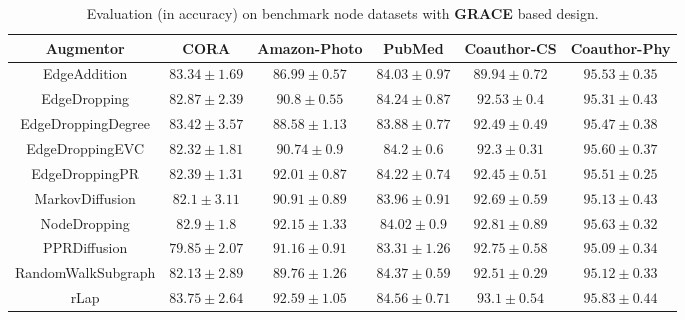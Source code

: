 \documentclass{article}
\theoremstyle{plain}
\theoremstyle{definition}
\theoremstyle{remark}
\begin{document}
\begin{table*}[ht!]
\centering
\caption{Evaluation (in accuracy) on benchmark node datasets with \textbf{GRACE} based design.}
\label{table:results_grace}
\vskip 0.15in
\begin{center}
\begin{small}
\begin{sc}
\begin{tabular}{c|c|c|c|c|c}
\toprule
Augmentor & CORA & Amazon-Photo & PubMed & Coauthor-CS & Coauthor-Phy \\
\midrule
EdgeAddition & $83.34 \pm 1.69$ &  $86.99 \pm 0.57$ & $84.03 \pm 0.97$ & $89.94 \pm 0.72$ & $95.53 \pm 0.35$ \\
EdgeDropping & $82.87 \pm 2.39$ & $90.8 \pm 0.55$ & $84.24 \pm 0.87$  & $92.53 \pm 0.4$ & $95.31 \pm 0.43$ \\
EdgeDroppingDegree & \underline{$83.42 \pm 3.57$}  & $88.58 \pm 1.13$ & $83.88 \pm 0.77$ & $92.49 \pm 0.49$ & $95.47 \pm 0.38$ \\
EdgeDroppingEVC & $82.32 \pm 1.81$ & $90.74 \pm 0.9$ & $84.2 \pm 0.6$  & $92.3 \pm 0.31$ & $95.60 \pm 0.37$\\
EdgeDroppingPR & $82.39 \pm 1.31$ & $92.01 \pm 0.87$  & $84.22 \pm 0.74$ & $92.45 \pm 0.51$ &  $95.51 \pm 0.25$ \\
MarkovDiffusion & $82.1 \pm 3.11$  &  $90.91 \pm 0.89$  & $83.96 \pm 0.91$ & $92.69 \pm 0.59$ &  $95.13 \pm 0.43$\\
NodeDropping & $82.9 \pm 1.8$  & \underline{$92.15 \pm 1.33$} & $84.02 \pm 0.9$ & \underline{$92.81 \pm 0.89$} & \underline{$95.63 \pm 0.32$}  \\
PPRDiffusion & $79.85 \pm 2.07$  & $91.16 \pm 0.91$ & $83.31 \pm 1.26$ & $92.75 \pm 0.58$ & $95.09 \pm 0.34$ \\
RandomWalkSubgraph & $82.13 \pm 2.89$ & $89.76 \pm 1.26$ & \underline{$84.37 \pm 0.59$}  & $92.51 \pm 0.29$ & $95.12 \pm 0.33$\\
rLap & $\mathbf{83.75 \pm 2.64}$  & $\mathbf{92.59 \pm 1.05}$ & $\mathbf{84.56 \pm 0.71}$ & $\mathbf{93.1 \pm 0.54}$  & $\mathbf{95.83 \pm 0.44}$ \\
\bottomrule
\end{tabular}
\end{sc}
\end{small}
\end{center}
\vskip -0.1in
\end{table*}
\end{document}
